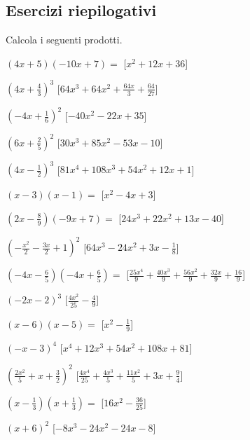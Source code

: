 \subsection{Esercizi riepilogativi}

\begin{esercizio}[\Ast]
\label{ese:10.21}
Calcola i seguenti prodotti.
 \begin{enumeratea}
\spazielenx
\item \(\left(4 x + 5\right)\left(- 10 x + 7\right)=\)
  \hfill [\(x^{2} + 12 x + 36\)]
\item \(\left(4 x + \frac{4}{3}\right)^{3}\)
  \hfill [\(64 x^{3} + 64 x^{2} + \frac{64 x}{3} + \frac{64}{27}\)]
\item \(\left(- 4 x + \frac{1}{6}\right)^{2}\)
  \hfill [\(- 40 x^{2} - 22 x + 35\)]
\item \(\left(6 x + \frac{2}{5}\right)^{2}\)
  \hfill [\(30 x^{3} + 85 x^{2} - 53 x - 10\)]
\item \(\left(4 x - \frac{1}{2}\right)^{3}\)
  \hfill [\(81 x^{4} + 108 x^{3} + 54 x^{2} + 12 x + 1\)]
\item \(\left(x - 3\right)\left(x - 1\right)=\)
  \hfill [\(x^{2} - 4 x + 3\)]
\item \(\left(2 x - \frac{8}{9}\right)\left(- 9 x + 7\right)=\)
  \hfill [\(24 x^{3} + 22 x^{2} + 13 x - 40\)]
\item \(\left(- \frac{x^{2}}{2} - \frac{3 x}{2} + 1\right)^{2}\)
  \hfill [\(64 x^{3} - 24 x^{2} + 3 x - \frac{1}{8}\)]
\item \(\left(- 4 x - \frac{6}{5}\right)\left(- 4 x + \frac{6}{5}\right)=\)
  \hfill [\(\frac{25 x^{4}}{9} + \frac{40 x^{3}}{9} + \frac{56 x^{2}}{9} + 
\frac{32 x}{9} + \frac{16}{9}\)]
\item \(\left(- 2 x - 2\right)^{3}\)
  \hfill [\(\frac{4 x^{2}}{25} - \frac{4}{9}\)]
\item \(\left(x - 6\right)\left(x - 5\right)=\)
  \hfill [\(x^{2} - \frac{1}{9}\)]
\item \(\left(- x - 3\right)^{4}\)
  \hfill [\(x^{4} + 12 x^{3} + 54 x^{2} + 108 x + 81\)]
\item \(\left(\frac{2 x^{2}}{5} + x + \frac{3}{2}\right)^{2}\)
  \hfill [\(\frac{4 x^{4}}{25} + \frac{4 x^{3}}{5} + \frac{11 x^{2}}{5} + 3 
x + \frac{9}{4}\)]
\item \(\left(x - \frac{1}{3}\right)\left(x + \frac{1}{3}\right)=\)
  \hfill [\(16 x^{2} - \frac{36}{25}\)]
\item \(\left(x + 6\right)^{2}\)
  \hfill [\(- 8 x^{3} - 24 x^{2} - 24 x - 8\)]

\end{enumeratea}
\end{esercizio}
